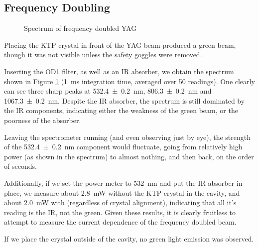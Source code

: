\documentclass[a4paper]{scrartcl}
\begin{document}

\subsection{Frequency Doubling}
\begin{figure}
    \centering
    \caption{Spectrum of frequency doubled YAG}
    \label{fig:4.5-spectrum}
\end{figure}

Placing the KTP crystal in front of the YAG beam produced a green beam, though it was not visible unless the safety goggles were removed.

Inserting the OD1 filter, as well as an IR absorber, we obtain the spectrum shown in Figure \ref{fig:4.5-spectrum} (\SI{1}{\milli\second} integration time, averaged over 50 readings). One clearly can see three sharp peaks at \SI{532.4 \pm 0.2}{\nano\metre}, \SI{806.3 \pm 0.2}{\nano\metre} and \SI{1067.3 \pm 0.2}{\nano\metre}. Despite the IR absorber, the spectrum is still dominated by the IR components, indicating either the weakness of the green beam, or the poorness of the absorber.

Leaving the spectrometer running (and even observing just by eye), the strength of the \SI{532.4 \pm 0.2}{\nano\metre} component would fluctuate, going from relatively high power (as shown in the spectrum) to almost nothing, and then back, on the order of seconds.

Additionally, if we set the power meter to \SI{532}{\nano\metre} and put the IR absorber in place, we measure about \SI{2.8}{\milli\watt} without the KTP crystal in the cavity, and about \SI{2.0}{\milli\watt} with (regardless of crystal alignment), indicating that all it's reading is the IR, not the green. Given these results, it is clearly fruitless to attempt to measure the current dependence of the frequency doubled beam.

If we place the crystal outside of the cavity, no green light emission was observed.
\end{document}
